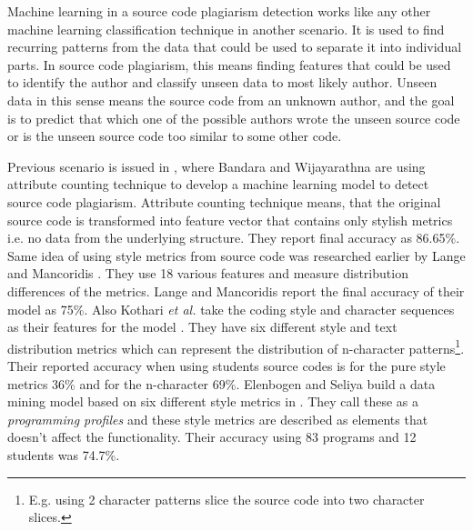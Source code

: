 \documentclass[english]{tktltiki2}
\theoremstyle{definition}
\theoremstyle{remark}
\begin{document}


Machine learning in a source code plagiarism detection works like any other machine learning classification technique in another scenario. It is used to find recurring patterns from the data that could be used to separate it into individual parts. In source code plagiarism, this means finding features that could be used to identify the author and classify unseen data to most likely author. Unseen data in this sense means the source code from an unknown author, and the goal is to predict that which one of the possible authors wrote the unseen source code or is the unseen source code too similar to some other code.


Previous scenario is issued in \cite{bandara2011machine}, where Bandara and Wijayarathna are using attribute counting technique to develop a machine learning model to detect source code plagiarism. Attribute counting technique means, that the original source code is transformed into feature vector that contains only stylish metrics i.e. no data from the underlying structure. They report final accuracy as 86.65\%. Same idea of using style metrics from source code was researched earlier by Lange and Mancoridis \cite{lange2007using}. They use 18 various features and measure distribution differences of the metrics. Lange and Mancoridis report the final accuracy of their model as 75\%. Also Kothari \textit{et al.} take the coding style and character sequences as their features for the model \cite{kothari2007probabilistic}. They have six different style  and text distribution metrics which can represent the distribution of n-character patterns\footnote{E.g. using 2 character patterns slice the source code into two character slices.}. Their reported accuracy when using students source codes is for the pure style metrics 36\% and for the n-character 69\%. Elenbogen and Seliya build a data mining model based on six different style metrics in \cite{Elenbogen:2008:DOS:1295109.1295123}. They call these as a \textit{programming profiles} and these style metrics are described as elements that doesn't affect the functionality. Their accuracy using 83 programs and 12 students was 74.7\%. 

\end{document}
